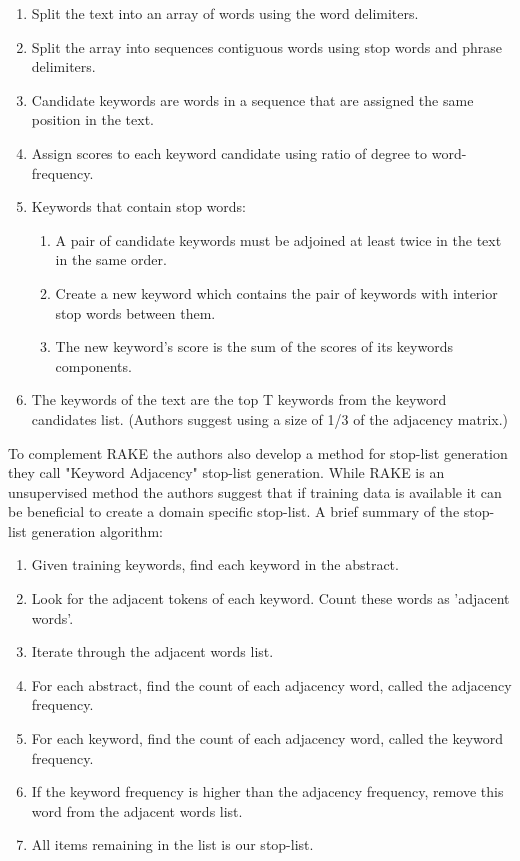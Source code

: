 \documentclass[11pt,a4paper]{article}
\begin{document}
\begin{enumerate}
	\small \itemsep0em 

	\item Split the text into an array of words using the word delimiters.
	\item Split the array into sequences contiguous words using stop words and phrase delimiters.
	\item Candidate keywords are words in a sequence that are assigned the same position in the text. 
	\item Assign scores to each keyword candidate using ratio of degree to word-frequency. 
	\item Keywords that contain stop words:
	\begin{enumerate}
		\item A pair of candidate keywords must be adjoined at least twice in the text in the same order.
		\item Create a new keyword which contains the pair of keywords with interior stop words between them.
		\item The new keyword’s score is the sum of the scores of its keywords components.
	\end{enumerate}
	\item The keywords of the text are the top T keywords from the keyword candidates list. (Authors suggest using a size of 1/3 of the adjacency matrix.)

	\normalsize
\end{enumerate}

To complement RAKE the authors also develop a method for stop-list generation they call "Keyword Adjacency" stop-list generation. While RAKE is an unsupervised method the authors suggest that if training data is available it can be beneficial to create a domain specific stop-list.  A brief summary of the stop-list generation algorithm:

\begin{enumerate}
	\small \itemsep0em 

	\item Given training keywords, find each keyword in the abstract.
	\item Look for the adjacent tokens of each keyword. Count these words as 'adjacent words'.
	\item Iterate through the adjacent words list.
	\item For each abstract, find the count of each adjacency word, called the adjacency frequency.
	\item For each keyword, find the count of each adjacency word, called the keyword frequency.
	\item If the keyword frequency is higher than the adjacency frequency, remove this word from the adjacent words list.
	\item All items remaining in the list is our stop-list. 

	\normalsize
\end{enumerate}
\end{document}
